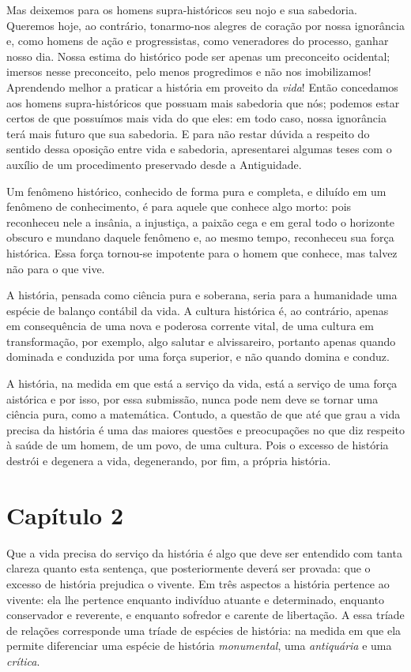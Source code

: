 Mas deixemos para os homens supra-históricos seu nojo e sua sabedoria.
Queremos hoje, ao contrário, tonarmo-nos alegres de coração por nossa
ignorância e, como homens de ação e progressistas, como veneradores do
processo, ganhar nosso dia. Nossa estima do histórico pode ser apenas um
preconceito ocidental; imersos nesse preconceito, pelo menos progredimos
e não nos imobilizamos! Aprendendo melhor a praticar a história em
proveito da \emph{vida}! Então concedamos aos homens supra-históricos
que possuam mais sabedoria que nós; podemos estar certos de que
possuímos mais vida do que eles: em todo caso, nossa ignorância terá
mais futuro que sua sabedoria. E para não restar dúvida a respeito do
sentido dessa oposição entre vida e sabedoria, apresentarei algumas
teses com o auxílio de um procedimento preservado desde a Antiguidade.

Um fenômeno histórico, conhecido de forma pura e completa, e diluído em
um fenômeno de conhecimento, é para aquele que conhece algo morto: pois
reconheceu nele a insânia, a injustiça, a paixão cega e em geral todo o
horizonte obscuro e mundano daquele fenômeno e, ao mesmo tempo,
reconheceu sua força histórica. Essa força tornou-se impotente para o
homem que conhece, mas talvez não para o que vive.

A história, pensada como ciência pura e soberana, seria para a
humanidade uma espécie de balanço contábil da vida. A cultura histórica
é, ao contrário, apenas em consequência de uma nova e poderosa corrente
vital, de uma cultura em transformação, por exemplo, algo salutar e
alvissareiro, portanto apenas quando dominada e conduzida por uma força
superior, e não quando domina e conduz.

A história, na medida em que está a serviço da vida, está a serviço de
uma força aistórica e por isso, por essa submissão, nunca pode nem deve
se tornar uma ciência pura, como a matemática. Contudo, a questão de que
até que grau a vida precisa da história é uma das maiores questões e
preocupações no que diz respeito à saúde de um homem, de um povo, de uma
cultura. Pois o excesso de história destrói e degenera a vida,
degenerando, por fim, a própria história.

\chapter{Capítulo 2}\label{capuxedtulo-2}

Que a vida precisa do serviço da história é algo que deve ser entendido
com tanta clareza quanto esta sentença, que posteriormente deverá ser
provada: que o excesso de história prejudica o vivente. Em três
aspectos a história pertence ao vivente: ela lhe pertence enquanto
indivíduo atuante e determinado, enquanto conservador e reverente, e
enquanto sofredor e carente de libertação. A essa tríade de relações
corresponde uma tríade de espécies de história: na medida em que ela
permite diferenciar uma espécie de história \emph{monumental}, uma
\emph{antiquária} e uma \emph{crítica}.

